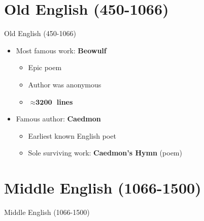 \documentclass[
  12pt,
  ignorenonframetext,
  progressbar=frametitle]{beamer}
\providecommand{\tightlist}{%
  \setlength{\itemsep}{0pt}\setlength{\parskip}{0pt}}
\begin{document}
\section{Old English (450-1066)}
\begin{frame}[allowframebreaks]
{Old English (450-1066)}
\begin{itemize}
\tightlist
\item
  Most famous work: \textbf{Beowulf}

  \begin{itemize}
  \tightlist
  \item
    Epic poem
  \item
    Author was anonymous
  \item
    \textbf{\(\boldsymbol\approx \textbf{3200}\) lines}
  \end{itemize}
\item
  Famous author: \textbf{Caedmon}

  \begin{itemize}
  \tightlist
  \item
    Earliest known English poet
  \item
    Sole surviving work: \textbf{Caedmon's Hymn} (poem)
  \end{itemize}
\end{itemize}
\end{frame}

\section{Middle English (1066-1500)}
\begin{frame}[allowframebreaks]
{Middle English (1066-1500)}
\end{frame}
\end{document}
